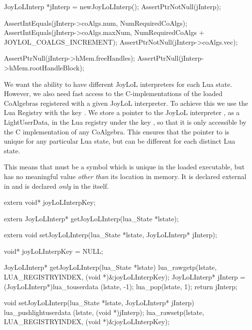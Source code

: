 \startCTest
  JoyLoLInterp *jInterp = newJoyLoLInterp();
  AssertPtrNotNull(jInterp);
  
  AssertIntEquals(jInterp->coAlgs.num,
    NumRequiredCoAlgs);
  AssertIntEquals(jInterp->coAlgs.maxNum,
    NumRequiredCoAlgs + JOYLOL_COALGS_INCREMENT);
  AssertPtrNotNull(jInterp->coAlgs.vec);
  
  AssertPtrNull(jInterp->hMem.freeHandles);
  AssertPtrNull(jInterp->hMem.rootHandleBlock);
\stopCTest
\stopTestCase
\stopTestSuite


We want the ability to have different JoyLoL interpreters for each Lua 
state. However, we also need fast access to the C-implementations of the 
loaded CoAlgebras registered with a given JoyLoL interpreter. To achieve 
this we use the Lua Registry with the  key 
. We store a pointer to the JoyLoL interpreter 
, as a LightUserData, in the Lua registry under the key 
, so that it is only accessible by the C 
implementation of any CoAlgebra. This ensures that the pointer to 
 is unique for any particular Lua state, but can be 
different for each distinct Lua state. 

This means that  must be a symbol which is unique in 
the loaded executable, but has no meaningful value \emph{other than} its 
location in memory. It is declared external in  and is 
declared \emph{only} in the  itself. 

\startCHeader
extern void* joyLoLInterpKey;

extern JoyLoLInterp* getJoyLoLInterp(lua_State *lstate);
\stopCHeader

\startCHeader
extern void setJoyLoLInterp(lua_State *lstate, JoyLoLInterp* jInterp);
\stopCHeader
{}

\startCCode
void* joyLoLInterpKey = NULL;

JoyLoLInterp* getJoyLoLInterp(lua_State *lstate) {
  lua_rawgetp(lstate, LUA_REGISTRYINDEX, (void *)&joyLoLInterpKey);
  JoyLoLInterp* jInterp = (JoyLoLInterp*)lua_touserdata (lstate, -1);
  lua_pop(lstate, 1);
  return jInterp;
}

void setJoyLoLInterp(lua_State *lstate, JoyLoLInterp* jInterp) {
  lua_pushlightuserdata (lstate, (void *)jInterp);
  lua_rawsetp(lstate, LUA_REGISTRYINDEX, (void *)&joyLoLInterpKey);
}
\stopCCode


